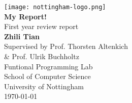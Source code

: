 \begin{titlepage}
    \centering
    
    \texttt{[image: nottingham-logo.png]} \\[1.5cm]
    
    {\huge \textbf{My Report!}} \\[0.5cm]
    {\huge First year review report} \\[2cm]
    
    {\huge \textbf{Zhili Tian}} \\[0.3cm]
    {\large Supervised by Prof. Thorsten Altenkich} \\ [0.3cm]
    {\large \& Prof. Ulrik Buchholtz} \\[1.5cm]

    {\large Funtional Programming Lab} \\[0.3cm]    
    {\large School of Computer Science} \\[0.3cm]
    {\large University of Nottingham} \\[2cm]
    
    {\large \today}
    
    \vfill %
\end{titlepage}
